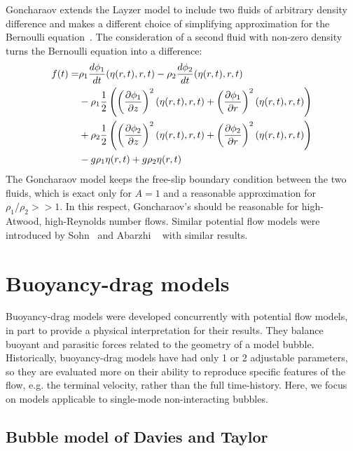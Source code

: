 Goncharaov extends the Layzer model to include two fluids of arbitrary density difference and makes a different choice of simplifying approximation for the Bernoulli equation~\cite{Goncharov2002}.
The consideration of a second fluid with non-zero density turns the Bernoulli equation  into a difference:
\begin{equation} \label{eqn:GonBernoulli}
\begin{aligned}
f(t) = &   \rho_1 \frac{d \phi_1}{d t}(\eta(r,t), r, t) - \rho_2 \frac{d \phi_2}{d t}(\eta(r,t), r, t) \\
& - \rho_1 \frac{1}{2} \left(\left(\frac{\partial \phi_1}{\partial z}\right)^2(\eta(r,t), r, t) +\left(\frac{\partial \phi_1}{\partial r}\right)^2(\eta(r,t), r, t)\right) \\
& + \rho_2 \frac{1}{2} \left(\left(\frac{\partial \phi_2}{\partial z}\right)^2(\eta(r,t), r, t) +\left(\frac{\partial \phi_2}{\partial r}\right)^2(\eta(r,t), r, t)\right) \\
& - g \rho_1 \eta(r,t) + g \rho_2 \eta(r,t) 
\end{aligned}
\end{equation}
The Goncharaov model keeps the free-slip boundary condition between the two fluids, which is exact only for $A = 1$ and a reasonable approximation for $\rho_1 / \rho_2 >> 1$.
In this respect, Goncharaov's should be reasonable for high-Atwood, high-Reynolds number flows.
Similar potential flow models were introduced by Sohn~\cite{Sohn2003} and Abarzhi \etal~\cite{Abarzhi2003} with similar results.

\section{Buoyancy-drag models}

Buoyancy-drag models were developed concurrently with potential flow models, in part to provide a physical interpretation for their results.
They balance buoyant and parasitic forces related to the geometry of a model bubble.
Historically, buoyancy-drag models have had only 1 or 2 adjustable parameters, so they are evaluated more on their ability to reproduce specific features of the flow, e.g. the terminal velocity, rather than the full time-history.
Here, we focus on models applicable to single-mode non-interacting bubbles.

\subsection{Bubble model of Davies and Taylor}

